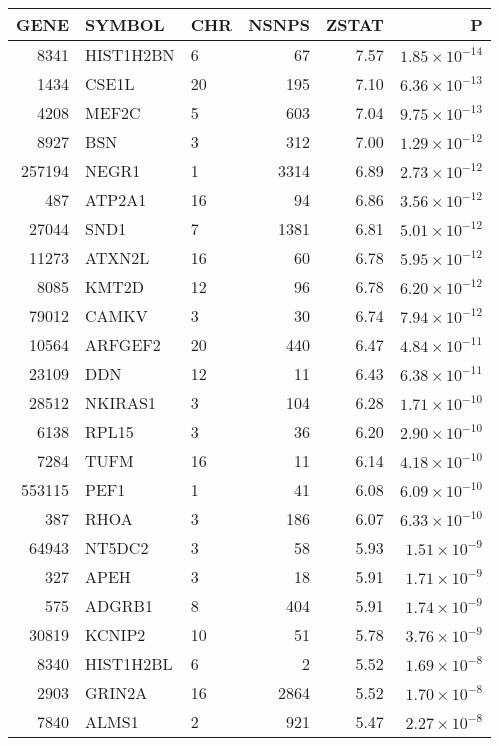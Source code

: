 \begin{table}[ht]
\centering
\begin{tabular}{rllrrr}
  \hline
GENE & SYMBOL & CHR & NSNPS & ZSTAT & P \\ 
  \hline
8341 & HIST1H2BN & 6 &  67 & 7.57 & $1.85 \times 10^{-14}$ \\ 
  1434 & CSE1L & 20 & 195 & 7.10 & $6.36 \times 10^{-13}$ \\ 
  4208 & MEF2C & 5 & 603 & 7.04 & $9.75 \times 10^{-13}$ \\ 
  8927 & BSN & 3 & 312 & 7.00 & $1.29 \times 10^{-12}$ \\ 
  257194 & NEGR1 & 1 & 3314 & 6.89 & $2.73 \times 10^{-12}$ \\ 
  487 & ATP2A1 & 16 &  94 & 6.86 & $3.56 \times 10^{-12}$ \\ 
  27044 & SND1 & 7 & 1381 & 6.81 & $5.01 \times 10^{-12}$ \\ 
  11273 & ATXN2L & 16 &  60 & 6.78 & $5.95 \times 10^{-12}$ \\ 
  8085 & KMT2D & 12 &  96 & 6.78 & $6.20 \times 10^{-12}$ \\ 
  79012 & CAMKV & 3 &  30 & 6.74 & $7.94 \times 10^{-12}$ \\ 
  10564 & ARFGEF2 & 20 & 440 & 6.47 & $4.84 \times 10^{-11}$ \\ 
  23109 & DDN & 12 &  11 & 6.43 & $6.38 \times 10^{-11}$ \\ 
  28512 & NKIRAS1 & 3 & 104 & 6.28 & $1.71 \times 10^{-10}$ \\ 
  6138 & RPL15 & 3 &  36 & 6.20 & $2.90 \times 10^{-10}$ \\ 
  7284 & TUFM & 16 &  11 & 6.14 & $4.18 \times 10^{-10}$ \\ 
  553115 & PEF1 & 1 &  41 & 6.08 & $6.09 \times 10^{-10}$ \\ 
  387 & RHOA & 3 & 186 & 6.07 & $6.33 \times 10^{-10}$ \\ 
  64943 & NT5DC2 & 3 &  58 & 5.93 & $1.51 \times 10^{-9}$ \\ 
  327 & APEH & 3 &  18 & 5.91 & $1.71 \times 10^{-9}$ \\ 
  575 & ADGRB1 & 8 & 404 & 5.91 & $1.74 \times 10^{-9}$ \\ 
  30819 & KCNIP2 & 10 &  51 & 5.78 & $3.76 \times 10^{-9}$ \\ 
  8340 & HIST1H2BL & 6 &   2 & 5.52 & $1.69 \times 10^{-8}$ \\ 
  2903 & GRIN2A & 16 & 2864 & 5.52 & $1.70 \times 10^{-8}$ \\ 
  7840 & ALMS1 & 2 & 921 & 5.47 & $2.27 \times 10^{-8}$ \\ 

\end{tabular}
\end{table}
